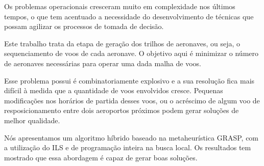 \documentclass[oneside,normaltoc,espacoduplo,PGTEXdissertacao]{pgeeltex}
\begin{document}
\begin{resumoPGTEX}
\doublespacing
Os problemas operacionais cresceram muito em complexidade nos
últimos tempos, o que tem acentuado a necessidade do desenvolvimento de
técnicas que possam agilizar os processos de tomada de decisão. 


Este trabalho trata da etapa de geração dos trilhos de aeronaves, ou seja, o
sequenciamento de voos de cada aeronave. O objetivo aqui é minimizar o número de
aeronaves necessárias para operar uma dada malha de voos.


 
 
 Esse problema possui é combinatoriamente explosivo e a sua resolução fica mais
 difícil à medida que a quantidade de voos envolvidos cresce. Pequenas
 modificações nos horários de partida desses voos, ou o acréscimo de algum voo
 de resposicionamento entre dois aeroportos próximos podem gerar soluções de
 melhor qualidade.
 
 Nós apresentamos um algoritmo híbrido baseado na
 metaheurística GRASP, com a utilização do ILS e de programação inteira na
 busca local.
 Os resultados tem mostrado que essa abordagem é capaz de
 gerar boas soluções.
 
 \\
 
 \end{resumoPGTEX}
\end{document}
